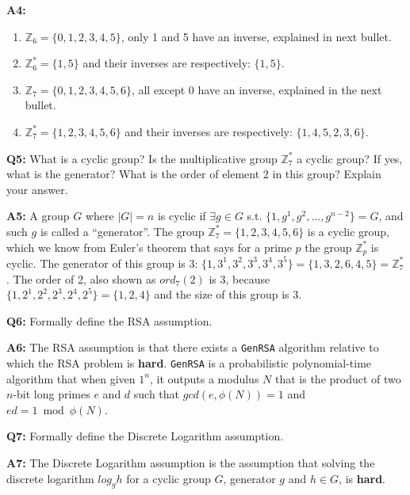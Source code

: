 \documentclass[12pt,reqno]{amsart}
\newcommand{\code}[1]{\texttt{#1}}
\begin{document}
\textbf{A4:}
\begin{enumerate}[label=\alph*.]
 \item $\mathbb{Z}_6 = \{0, 1, 2, 3, 4, 5\}$, only 1 and 5 have an inverse, explained in next bullet.
 \item $\mathbb{Z}_6^* = \{1, 5\}$ and their inverses are respectively: $\{1, 5\}$.
 \item $\mathbb{Z}_7 = \{0, 1, 2, 3, 4, 5, 6\}$, all except 0 have an inverse, explained in the next bullet.
 \item $\mathbb{Z}_7^* = \{1, 2, 3, 4, 5, 6\}$ and their inverses are respectively: $\{1, 4, 5, 2, 3, 6\}$.
\end{enumerate}

\vspace{20px}
\textbf{Q5:} What is a cyclic group? Is the multiplicative group $\mathbb{Z}_7^*$ a cyclic group? If yes, what is the generator? What is the order of element 2 in this group? Explain your answer.

\textbf{A5:} A group $G$ where $|G|=n$ is cyclic if $\exists g \in G$ s.t. $\{1, g^1, g^2, \ldots, g^{n-2}\} = G$, and such $g$ is called a ``generator''. The group $\mathbb{Z}_7^* = \{1, 2, 3, 4, 5, 6\}$ is a cyclic group, which we know from Euler's theorem that says for a prime $p$ the group $\mathbb{Z}_p^*$ is cyclic. The generator of this group is 3: $\{1, 3^1, 3^2, 3^3, 3^4, 3^5\} = \{1, 3, 2, 6, 4, 5\} = \mathbb{Z}_7^*$. The order of 2, also shown as $ord_7(2)$ is 3, because $\{1, 2^1, 2^2, 2^3, 2^4, 2^5\}=\{1, 2, 4\}$ and the size of this group is 3.


\vspace{20px}
\textbf{Q6:} Formally define the RSA assumption.

\textbf{A6:} The RSA assumption is that there exists a \code{GenRSA} algorithm relative to which the RSA problem is \textbf{hard}. \code{GenRSA} is a probabilistic polynomial-time algorithm that when given $1^n$, it outputs a modulus $N$ that is the product of two $n$-bit long primes $e$ and $d$ such that $gcd(e,\phi(N))=1$ and $ed = 1 \bmod \phi(N)$.

\vspace{20px}
\textbf{Q7:} Formally define the Discrete Logarithm assumption.

\textbf{A7:} The Discrete Logarithm assumption is the assumption that solving the discrete logarithm $log_gh$ for a cyclic group $G$, generator $g$ and $h \in G$, is \textbf{hard}.
\end{document}
